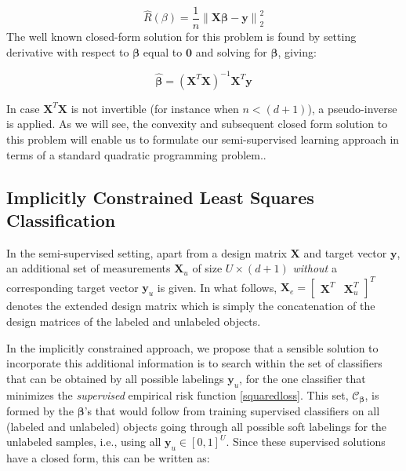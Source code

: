 \documentclass{llncs}
\newcommand{\featdim}{d}
\newcommand{\Nunl}{U}
\begin{document}
\begin{equation} \label{squaredloss}
\hat{R}(\beta) = \frac{1}{n} \left\|  \mathbf{X} \boldsymbol{\beta}-\mathbf{y} \right\| _2^2
\end{equation}
The well known closed-form solution for this problem is found by setting derivative with respect to $\boldsymbol{\beta}$ equal to $\textbf{0}$ and solving for $\boldsymbol{\beta}$, giving:

\begin{equation} \label{olssolution}
\boldsymbol{\hat{\beta}}=\left(\mathbf{X}^T \mathbf{X}\right)^{-1} \mathbf{X}^T \mathbf{y}
\end{equation}

In case $\textbf{X}^T \textbf{X}$ is not invertible (for instance when $n<(\featdim+1)$), a pseudo-inverse is applied. As we will see, the convexity and subsequent closed form solution to this problem will enable us to formulate our semi-supervised learning approach in terms of a standard quadratic programming problem..

\subsection{Implicitly Constrained Least Squares Classification} \label{section:icls}

In the semi-supervised setting, apart from a design matrix $\textbf{X}$ and target vector $\textbf{y}$, an additional set of measurements $\textbf{X}_u$ of size $\Nunl \times (\featdim+1)$ \emph{without} a corresponding target vector $\textbf{y}_u$ is given. In what follows, $\mathbf{X}_e=\begin{bmatrix} \mathbf{X}^T  & \mathbf{X}_u^T \end{bmatrix}^T$ denotes the extended design matrix which is simply the concatenation of the design matrices of the labeled and unlabeled objects.

In the implicitly constrained approach, we propose that a sensible solution to incorporate this additional information is to search within the set of classifiers that can be obtained by all possible labelings $\textbf{y}_u$, for the one classifier that minimizes the \emph{supervised} empirical risk function \eqref{squaredloss}. This set, $\mathcal{C}_{\boldsymbol{\beta}}$, is formed by the $\boldsymbol{\beta}$'s that would follow from training supervised classifiers on all (labeled and unlabeled) objects going through all possible soft labelings for the unlabeled samples, i.e., using all $\textbf{y}_u \in [0,1]^{\Nunl}$. Since these supervised solutions have a closed form, this can be written as:
\end{document}

